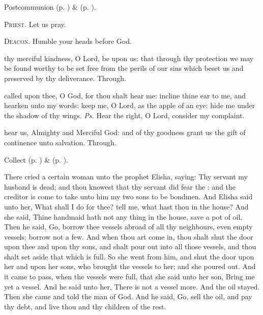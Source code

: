 \begin{rubric}
     Postcommunion  (p. \pageref{AshWednesdayMassPostcommunion}) \&   (p. \pageref{SPLivingDeparted}).
\end{rubric}

\textsc{Priest.} Let us pray.\par
\textsc{Deacon.} Humble your heads before God.\par
{} thy merciful kindness, O Lord, be upon us: that through thy protection we may be found worthy to be set free from the perils of our sins which beset us and preserved by thy deliverance. Through.


\introit
{} called upon thee, O God, for thou shalt hear me: incline thine ear to me, and hearken unto my words: keep me, O Lord, as the apple of an eye: hide me under the shadow of thy wings. \textit{Ps.} Hear the right, O Lord, consider my complaint.

\collect
{} hear us, Almighty and Merciful God: and of thy goodness grant us the gift of continence unto salvation. Through.


\begin{rubric}
     Collect  (p. \pageref{AshWednesdayMassCollect}) \&   (p. \pageref{SPLivingDeparted}).
\end{rubric}


\vspace{-0.25\baselineskip}

 There cried a certain woman unto the prophet Elisha, saying: Thy servant my husband is dead; and thou knowest that thy servant did fear the : and the creditor is come to take unto him my two sons to be bondmen. And Elisha said unto her, What shall I do for thee? tell me, what hast thou in the house? And she said, Thine handmaid hath not any thing in the house, save a pot of oil. Then he said, Go, borrow thee vessels abroad of all thy neighbours, even empty vessels; borrow not a few. And when thou art come in, thou shalt shut the door upon thee and upon thy sons, and shalt pour out into all those vessels, and thou shalt set aside that which is full. So she went from him, and shut the door upon her and upon her sons, who brought the vessels to her; and she poured out. And it came to pass, when the vessels were full, that she said unto her son, Bring me yet a vessel. And he said unto her, There is not a vessel more. And the oil stayed. Then she came and told the man of God. And he said, Go, sell the oil, and pay thy debt, and live thou and thy children of the rest.

